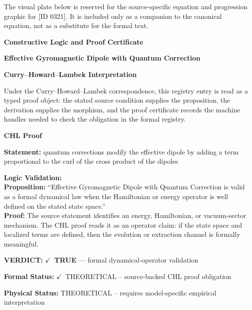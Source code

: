 \begingroup\footnotesize\sloppy
The visual plate below is reserved for the source-specific equation and progression graphic for [ID 0321]. It is included only as a companion to the canonical equation, not as a substitute for the formal text.
\par\endgroup
\ifTZPDarkEdition
{}
\fi

\clearpage
\begingroup\tzpsupportsetup
\noindent\textbf{\fontsize{10.8pt}{12.8pt}\selectfont [ID 0321] Constructive Logic and Proof Certificate}\par
\noindent\textbf{\fontsize{10pt}{12pt}\selectfont Effective Gyromagnetic Dipole with Quantum Correction}\par
\vspace{0.45em}
\begingroup
\footnotesize
\setlength{\parskip}{0.22em}
\setlength{\parindent}{0pt}
\noindent\textbf{Curry--Howard--Lambek Interpretation}\par
Under the Curry--Howard--Lambek correspondence, this registry entry is read as a typed proof
object: the stated source condition supplies the proposition, the derivation supplies the
morphism, and the proof certificate records the machine handles needed to check the obligation
in the formal registry.

\vspace{0.45em}
\noindent\textbf{CHL Proof}\par
\textbf{Statement:} quantum corrections modify the effective dipole by adding a term proportional to the
curl of the cross product of the dipoles

\textbf{Logic Validation:}\\
\textbf{Proposition:} ``Effective Gyromagnetic Dipole with Quantum Correction is valid as a formal dynamical law
when the Hamiltonian or energy operator is well defined on the stated state space.''\\
\textbf{Proof:} The source statement identifies an energy, Hamiltonian, or vacuum-sector mechanism. The
CHL proof reads it as an operator claim: if the state space and localized terms are
defined, then the evolution or extraction channel is formally meaningful.

\textbf{VERDICT:} \ensuremath{\checkmark}\ \textbf{TRUE} --- formal dynamical-operator validation

\textbf{Formal Status:} \ensuremath{\checkmark}\ THEORETICAL -- source-backed CHL proof obligation

\textbf{Physical Status:} THEORETICAL -- requires model-specific empirical interpretation
\par\vspace{0.45em}
\par
\ifTZPDarkEdition
{}
\fi
\endgroup
\endgroup
